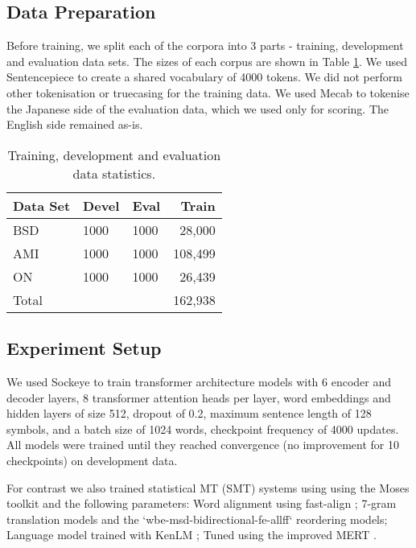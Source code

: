 \documentclass[11pt,a4paper]{article}
\begin{document}
\subsection{Data Preparation}
\label{sec:mt-data}

Before training, we split each of the corpora into 3 parts - training, development and evaluation data sets. The sizes of each corpus are shown in Table \ref{tab:training-data-table}. We used Sentencepiece \cite{kudo2018sentencepiece} to create a shared vocabulary of 4000 tokens. We did not perform other tokenisation or truecasing for the training data. We used Mecab \cite{kudo2006mecab} to tokenise the Japanese side of the evaluation data, which we used only for scoring. The English side remained as-is.

\begin{table}[t]
\begin{small}
    \centering
    \begin{tabular}{|l|l|l|r|}
    \hline
    Data Set & Devel & Eval & Train \\ \hline
    BSD     & 1000 & 1000 & 28,000 \\
    AMI     & 1000 & 1000 & 108,499 \\ 
    ON      & 1000 & 1000 & 26,439 \\ \hline
    Total   & \multicolumn{3}{r|}{162,938} \\ \hline
    \end{tabular}
    \caption{Training, development and evaluation data statistics.}
    \label{tab:training-data-table}
    \end{small}
\end{table}

\subsection{Experiment Setup}
\label{sec:mt-setup}

We used Sockeye \cite{Sockeye:17} to train transformer architecture models with 6 encoder and decoder layers, 8 transformer attention heads per layer, word embeddings and hidden layers of size 512, dropout of 0.2, maximum sentence length of 128 symbols, and a batch size of 1024 words, checkpoint frequency of 4000 updates. All models were trained until they reached convergence (no improvement for 10 checkpoints) on development data.

For contrast we also trained statistical MT (SMT) systems using using the Moses \cite{Koehn2007Moses:Translation} toolkit and the following parameters: Word alignment using fast-align \cite{dyer2013simple}; 7-gram  translation  models  and  the `wbe-msd-bidirectional-fe-allff` reordering models; Language model trained with KenLM \cite{heafield2011kenlm}; Tuned using the improved MERT \cite{bertoldi2009improved}.
\end{document}
